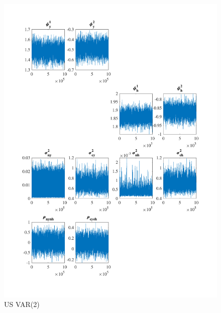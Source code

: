 \documentclass[
  12pt,
]{article}
\begin{document}
\begin{figure}

{\centering \includegraphics[width=0.85\linewidth]{../../Regression/Bayesian_UC_VAR2_drift/OutputData/posteriorchain_US} 

}

\caption{US VAR(2)}\label{fig:unnamed-chunk-18}
\end{figure}
\end{document}
